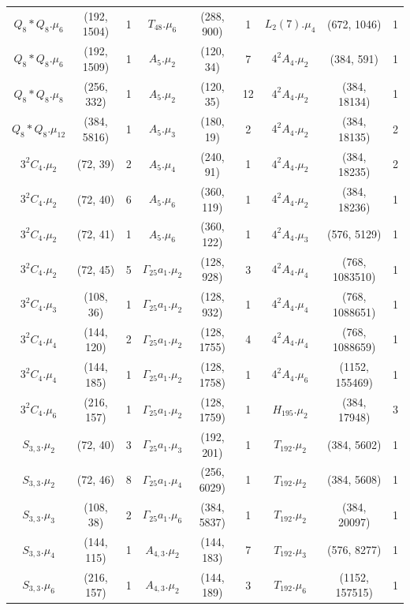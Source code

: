 \documentclass[a4paper]{amsart}
\theoremstyle{definition}
\theoremstyle{plain}
\begin{document}
{\begin{longtable}{ccc|ccc|ccc}
\rowcolor{lightgray}
$Q_8 * Q_8.\mu_{6}$&(192, 1504)&1 & $T_{48}.\mu_{6}$&(288, 900)&1 & $L_2(7).\mu_{4}$&(672, 1046)&1\\
$Q_8 * Q_8.\mu_{6}$&(192, 1509)&1 & $A_5.\mu_{2}$&(120, 34)&7 & $4^2A_4.\mu_{2}$&(384, 591)&1\\
\rowcolor{lightgray}
$Q_8 * Q_8.\mu_{8}$&(256, 332)&1 & $A_5.\mu_{2}$&(120, 35)&12 & $4^2A_4.\mu_{2}$&(384, 18134)&1\\
$Q_8 * Q_8.\mu_{12}$&(384, 5816)&1 & $A_5.\mu_{3}$&(180, 19)&2 & $4^2A_4.\mu_{2}$&(384, 18135)&2\\
\rowcolor{lightgray}
$3^2C_4.\mu_{2}$&(72, 39)&2 & $A_5.\mu_{4}$&(240, 91)&1 & $4^2A_4.\mu_{2}$&(384, 18235)&2\\
$3^2C_4.\mu_{2}$&(72, 40)&6 & $A_5.\mu_{6}$&(360, 119)&1 & $4^2A_4.\mu_{2}$&(384, 18236)&1\\
\rowcolor{lightgray}
$3^2C_4.\mu_{2}$&(72, 41)&1 & $A_5.\mu_{6}$&(360, 122)&1 & $4^2A_4.\mu_{3}$&(576, 5129)&1\\
$3^2C_4.\mu_{2}$&(72, 45)&5 & $\Gamma_{25}a_1.\mu_{2}$&(128, 928)&3 & $4^2A_4.\mu_{4}$&(768, 1083510)&1\\
\rowcolor{lightgray}
$3^2C_4.\mu_{3}$&(108, 36)&1 & $\Gamma_{25}a_1.\mu_{2}$&(128, 932)&1 & $4^2A_4.\mu_{4}$&(768, 1088651)&1\\
$3^2C_4.\mu_{4}$&(144, 120)&2 & $\Gamma_{25}a_1.\mu_{2}$&(128, 1755)&4 & $4^2A_4.\mu_{4}$&(768, 1088659)&1\\
\rowcolor{lightgray}
$3^2C_4.\mu_{4}$&(144, 185)&1 & $\Gamma_{25}a_1.\mu_{2}$&(128, 1758)&1 & $4^2A_4.\mu_{6}$&(1152, 155469)&1\\
$3^2C_4.\mu_{6}$&(216, 157)&1 & $\Gamma_{25}a_1.\mu_{2}$&(128, 1759)&1 & $H_{195}.\mu_{2}$&(384, 17948)&3\\
\rowcolor{lightgray}
$S_{3,3}.\mu_{2}$&(72, 40)&3 & $\Gamma_{25}a_1.\mu_{3}$&(192, 201)&1 & $T_{192}.\mu_{2}$&(384, 5602)&1\\
$S_{3,3}.\mu_{2}$&(72, 46)&8 & $\Gamma_{25}a_1.\mu_{4}$&(256, 6029)&1 & $T_{192}.\mu_{2}$&(384, 5608)&1\\
\rowcolor{lightgray}
$S_{3,3}.\mu_{3}$&(108, 38)&2 & $\Gamma_{25}a_1.\mu_{6}$&(384, 5837)&1 & $T_{192}.\mu_{2}$&(384, 20097)&1\\
$S_{3,3}.\mu_{4}$&(144, 115)&1 & $A_{4,3}.\mu_{2}$&(144, 183)&7 & $T_{192}.\mu_{3}$&(576, 8277)&1\\
\rowcolor{lightgray}
$S_{3,3}.\mu_{6}$&(216, 157)&1 & $A_{4,3}.\mu_{2}$&(144, 189)&3 & $T_{192}.\mu_{6}$&(1152, 157515)&1\\

\end{longtable}}
\end{document}
